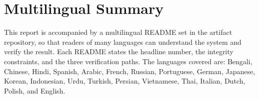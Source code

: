 \documentclass[11pt,a4paper]{article}
\begin{document}


\section{Multilingual Summary}
\label{sec:multilingual}

This report is accompanied by a multilingual README set in the artifact repository, so
that readers of many languages can understand the system and verify the result. Each
README states the headline number, the integrity constraints, and the three verification
paths. The languages covered are: Bengali, Chinese, Hindi, Spanish, Arabic, French,
Russian, Portuguese, German, Japanese, Korean, Indonesian, Urdu, Turkish, Persian,
Vietnamese, Thai, Italian, Dutch, Polish, and English.
\end{document}
